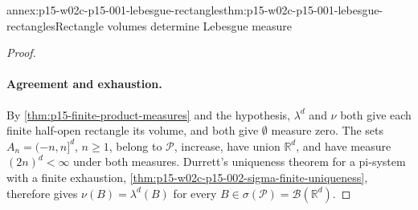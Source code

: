 \begin{annexitem}{annex:p15-w02c-p15-001-lebesgue-rectangles}{thm:p15-w02c-p15-001-lebesgue-rectangles}{Rectangle volumes determine Lebesgue measure}
\begin{proof}
\paragraph{Agreement and exhaustion.}
By \cref{thm:p15-finite-product-measures} and the hypothesis, \(\lambda^d\)
and \(\nu\) both give each finite half-open rectangle its volume, and both
give \(\emptyset\) measure zero. The sets \(A_n=(-n,n]^d\), \(n\geq1\),
belong to \(\mathcal P\), increase, have union \(\mathbb R^d\), and have
measure \((2n)^d<\infty\) under both measures. Durrett's
uniqueness theorem for a pi-system with a finite exhaustion,
\cref{thm:p15-w02c-p15-002-sigma-finite-uniqueness}, therefore gives
\(\nu(B)=\lambda^d(B)\) for every \(B\in\sigma(\mathcal P)=\mathcal B(\mathbb R^d)\).
\end{proof}
\end{annexitem}

